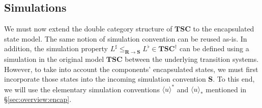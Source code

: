\documentclass[acmsmall,screen,review,anonymous]{acmart}
\newcommand{\kw}[1]{\ensuremath{ \mathsf{#1} }}
\begin{document}
%
%
%
%
%
%

\subsection{Simulations} %

We must now extend the double category structure of $\mathbf{TSC}$
to the encapsulated state model.
The same notion of simulation convention can be reused as-is.
In addition,
the simulation property
$L^\sharp \le_{\mathbf{R} \rightarrow \mathbf{S}} L^\flat \in \mathbf{TSC}^\dagger$
can be defined using a simulation
in the original model $\mathbf{TSC}$
between the underlying transition systems.
However,
to take into account the components' encapsulated states,
we must first incorporate those states into
the incoming simulation convention $\mathbf{S}$.
To this end,
we will use the elementary simulation conventions
$\langle u \rangle^*$ and $\langle u \rangle_*$
mentioned in \S\ref{sec:overview:encap}.
\end{document}
